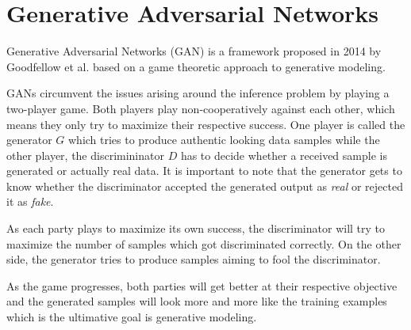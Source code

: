 \section{Generative Adversarial Networks}
\label{sec:gan}

Generative Adversarial Networks (GAN) is a framework proposed in 2014 by Goodfellow et al. \cite{gan:2014} based on a game theoretic approach to generative modeling.

GANs circumvent the issues arising around the inference problem by playing a two-player game. Both players play non-cooperatively against each other, which means they only try to maximize their respective success.
One player is called the generator $G$ which tries to produce authentic looking data samples while the other player, the discrimininator $D$ has to decide whether a received sample is generated or actually real data.
It is important to note that the generator gets to know whether the discriminator accepted the generated output as \emph{real} or rejected it as \emph{fake}.

As each party plays to maximize its own success, the discriminator will try to maximize the number of samples which got discriminated correctly.
On the other side, the generator tries to produce samples aiming to fool the discriminator.

As the game progresses, both parties will get better at their respective objective and the generated samples will look more and more like the training examples which is the ultimative goal is generative modeling.\\



